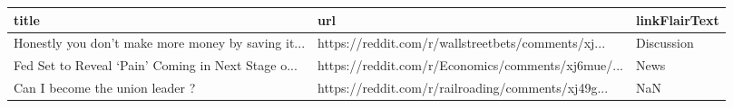 \documentclass{article}%
\begin{document}
\begin{table}[htbp]%
\centering%
\begin{adjustbox}{width=1\textwidth}%
\begin{tabular}{lll}
\toprule
                                             title &                                                url & linkFlairText \\
\midrule
Honestly you don’t make more money by saving it... & https://reddit.com/r/wallstreetbets/comments/xj... &    Discussion \\
Fed Set to Reveal ‘Pain’ Coming in Next Stage o... & https://reddit.com/r/Economics/comments/xj6mue/... &          News \\
                   Can I become the union leader ? & https://reddit.com/r/railroading/comments/xj49g... &           NaN \\
\bottomrule
\end{tabular}
%
\end{adjustbox}%
\end{table}

%
\end{document}
